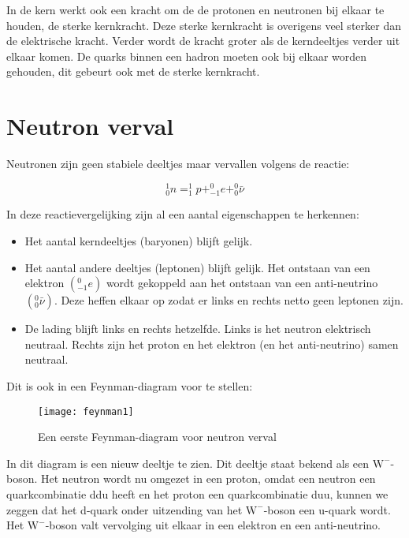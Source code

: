 In de kern werkt ook een kracht om de de protonen en neutronen bij
elkaar te houden, de sterke kernkracht. Deze sterke kernkracht is
overigens veel sterker dan de elektrische kracht. Verder wordt de
kracht groter als de kerndeeltjes verder uit elkaar komen. De quarks
binnen een hadron moeten ook bij elkaar worden gehouden, dit gebeurt
ook met de sterke kernkracht.


\section{Neutron verval}

Neutronen zijn geen stabiele deeltjes maar vervallen volgens de reactie:

\begin{equation}
_{0}^{1}n=_{1}^{1}p+_{-1}^{0}e+_{0}^{0}\bar{\nu}
\end{equation}


In deze reactievergelijking zijn al een aantal eigenschappen te herkennen: 
\begin{itemize}
\item Het aantal kerndeeltjes (baryonen) blijft gelijk.
\item Het aantal andere deeltjes (leptonen) blijft gelijk. Het ontstaan
van een elektron $\left(_{-1}^{0}e\right)$ wordt gekoppeld aan het
ontstaan van een anti-neutrino $\left(_{0}^{0}\bar{\nu}\right)$.
Deze heffen elkaar op zodat er links en rechts netto geen leptonen
zijn.
\item De lading blijft links en rechts hetzelfde. Links is het neutron elektrisch
neutraal. Rechts zijn het proton en het elektron (en het anti-neutrino)
samen neutraal.
\end{itemize}
Dit is ook in een Feynman-diagram voor te stellen:

\begin{figure}[h]
\noindent \begin{centering}
\texttt{[image: feynman1]}
\par\end{centering}

\caption{Een eerste Feynman-diagram voor neutron verval}
\end{figure}


In dit diagram is een nieuw deeltje te zien. Dit deeltje staat bekend
als een $\mathrm{W}^{-}$-boson. Het neutron wordt nu omgezet in een
proton, omdat een neutron een quarkcombinatie ddu heeft en het proton
een quarkcombinatie duu, kunnen we zeggen dat het d-quark onder uitzending
van het $\mathrm{W}^{-}$-boson een u-quark wordt. Het $\mathrm{W}^{-}$-boson
valt vervolging uit elkaar in een elektron en een anti-neutrino. 

